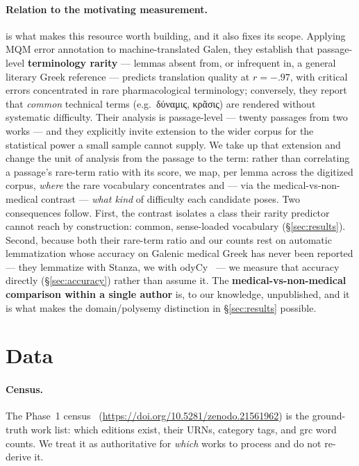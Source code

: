 \documentclass[11pt]{article}
\begin{document}
\paragraph{Relation to the motivating measurement.}
\citet{galen-mt-mqm-2026} is what makes this resource worth building, and it also fixes its scope.
Applying MQM error annotation to machine-translated Galen, they establish that passage-level
\textbf{terminology rarity} --- lemmas absent from, or infrequent in, a general literary Greek
reference --- predicts translation quality at $r = -.97$, with critical errors concentrated in rare
pharmacological terminology; conversely, they report that \textit{common} technical terms (e.g.\
δύναμις, κρᾶσις) are rendered without systematic difficulty. Their analysis is passage-level ---
twenty passages from two works --- and they explicitly invite extension to the wider corpus for the
statistical power a small sample cannot supply. We take up that extension and change the unit of
analysis from the passage to the term: rather than correlating a passage's rare-term ratio with its
score, we map, per lemma across the digitized corpus, \textit{where} the rare vocabulary concentrates
and --- via the medical-vs-non-medical contrast --- \textit{what kind} of difficulty each candidate
poses. Two consequences follow. First, the contrast isolates a class their rarity predictor cannot
reach by construction: common, sense-loaded vocabulary (\S\ref{sec:results}). Second, because both
their rare-term ratio and our counts rest on automatic lemmatization whose accuracy on Galenic
medical Greek has never been reported --- they lemmatize with Stanza, we with
odyCy~\citep{kostkan-etal-2023-odycy} --- we measure that accuracy directly (\S\ref{sec:accuracy})
rather than assume it. The \textbf{medical-vs-non-medical comparison within a single author} is, to
our knowledge, unpublished, and it is what makes the domain/polysemy distinction in
\S\ref{sec:results} possible.

\section{Data}
\label{sec:data}

\paragraph{Census.}
The Phase~1 census~\citep{pepperman-2026-galen-census}
(\url{https://doi.org/10.5281/zenodo.21561962}) is the ground-truth work list:
which editions exist, their URNs, category tags, and grc word counts. We treat it as authoritative
for \textit{which} works to process and do not re-derive it.
\end{document}
